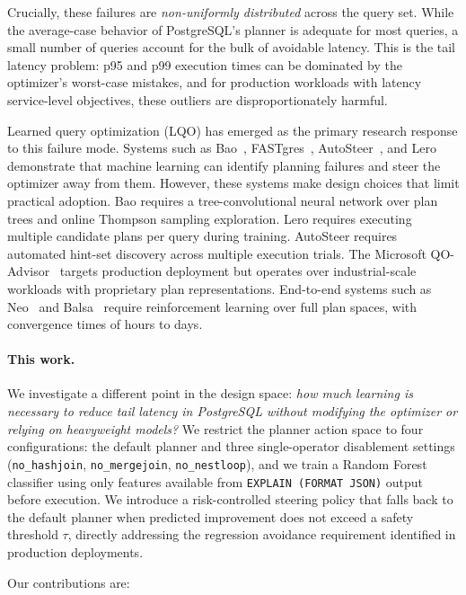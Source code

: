 \documentclass[sigconf,natbib=false]{article}
\newcommand{\postgres}{PostgreSQL}
\newcommand{\arm}[1]{\texttt{#1}}
\newcommand{\threshold}{\tau}
\begin{document}
Crucially, these failures are \emph{non-uniformly distributed} across the query set. While
the average-case behavior of \postgres{}'s planner is adequate for most queries, a small
number of queries account for the bulk of avoidable latency. This is the tail latency problem:
p95 and p99 execution times can be dominated by the optimizer's worst-case mistakes, and for
production workloads with latency service-level objectives, these outliers are
disproportionately harmful.

Learned query optimization (LQO) has emerged as the primary research response to this
failure mode. Systems such as Bao~\cite{Marcus2021Bao}, FASTgres~\cite{Habich2023},
AutoSteer~\cite{Anneser2023}, and Lero~\cite{Zhu2023Lero} demonstrate that machine learning
can identify planning failures and steer the optimizer away from them. However, these systems
make design choices that limit practical adoption. Bao requires a tree-convolutional neural
network over plan trees and online Thompson sampling exploration. Lero requires executing
multiple candidate plans per query during training. AutoSteer requires automated hint-set
discovery across multiple execution trials. The Microsoft QO-Advisor~\cite{Ding2022} targets
production deployment but operates over industrial-scale workloads with proprietary plan
representations. End-to-end systems such as Neo~\cite{Marcus2019Neo} and
Balsa~\cite{Yang2022Balsa} require reinforcement learning over full plan spaces, with
convergence times of hours to days.

\paragraph{This work.} We investigate a different point in the design space: \emph{how much
learning is necessary to reduce tail latency in \postgres{} without modifying the optimizer
or relying on heavyweight models?} We restrict the planner action space to four
configurations: the default planner and three single-operator disablement settings
(\arm{no\_hashjoin}, \arm{no\_mergejoin}, \arm{no\_nestloop}), and we train a Random Forest
classifier using only features available from \texttt{EXPLAIN (FORMAT JSON)} output before
execution. We introduce a risk-controlled steering policy that falls back to the default
planner when predicted improvement does not exceed a safety threshold $\threshold$, directly
addressing the regression avoidance requirement identified in production deployments.

Our contributions are:
\end{document}
